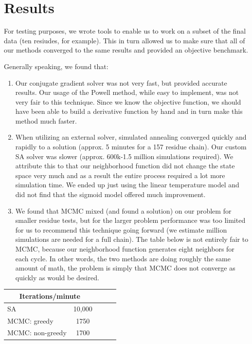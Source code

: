 \documentclass{article}
\begin{document}
\section{Results}

For testing purposes, we wrote tools to enable us to work on a subset of the final data (ten resiudes, for example).  This in turn allowed us to make sure that all of our methods converged to the same results and provided an objective benchmark.

Generally speaking, we found that:

\begin{enumerate}

\item Our conjugate gradient solver was not very fast, but provided accurate results.  Our usage of the Powell method, while easy to implement, was not very fair to this technique.  Since we know the objective function, we should have been able to build a derivative function by hand and in turn make this method much faster.

\item When utilizing an external solver, simulated annealing converged quickly and rapidly to a solution (approx. 5 minutes for a 157 residue chain).  Our custom SA solver was slower (approx. 600k-1.5 million simulations required).  We attribute this to that our neighborhood function did not change the state space very much and as a result the entire process required a lot more simulation time.  We ended up just using the linear temperature model and did not find that the sigmoid model offered much improvement.

\item We found that MCMC mixed (and found a solution) on our problem for smaller residue tests, but for the larger problem performance was too limited for us to recommend this technique going forward (we estimate  million simulations are needed for a full chain).  The table below is not entirely fair to MCMC, because our neighborhood function generates eight neighbors for each cycle.  In other words, the two methods are doing roughly the same amount of math, the problem is simply that MCMC does not converge as quickly as would be desired.\\

\end{enumerate}


\begin{center}
\begin{tabular}{|l|c|c|c|r|}
\multicolumn{2}{c}{Iterations/minute} \\
    \hline
    SA & 10,000 \\ \hline
    MCMC: greedy & 1750    \\ \hline
    MCMC: non-greedy & 1700    \\ \hline
    \end{tabular}
\end{center}
\end{document}
